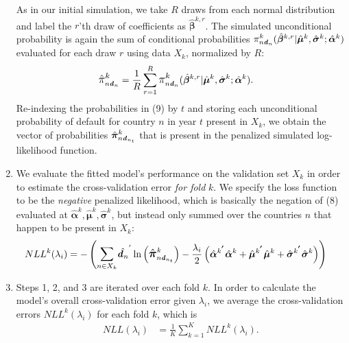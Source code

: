 \documentclass[12pt]{article}
\begin{document}
\begin{enumerate}[listparindent=\parindent]
As in our initial simulation, we take $R$ draws from each normal distribution and label the $r$'th draw of coefficients as $\hat{\boldsymbol{\beta}}^{k,r}$. The simulated unconditional probability is again the sum of conditional probabilities $\mathlarger{\pi^{k}}_{n\boldsymbol{\mathit{d}}_n}(\hat{\boldsymbol{\beta}}^{k,r}|\hat{\boldsymbol{\mu}}^{k}, \hat{\boldsymbol{\sigma}}^{k}; \hat{\boldsymbol{\alpha}}^{k})$ evaluated for each draw $r$ using data $X_k$, normalized by $R$:
\begin{align}
\mathlarger{\hat{\pi}^{k}}_{n\boldsymbol{\mathit{d}}_n} &= 
\frac{1}{R} \sum\limits_{r=1}^{R} \mathlarger{\pi^{k}}_{n\boldsymbol{\mathit{d}}_n}(\hat{\boldsymbol{\beta}}^{k,r}|\hat{\boldsymbol{\mu}}^{k}, \hat{\boldsymbol{\sigma}}^{k}; \hat{\boldsymbol{\alpha}}^{k}).
\end{align}
Re-indexing the probabilities in (9) by $t$ and storing each unconditional probability of default for country $n$ in year $t$ present in $X_k$, we obtain the vector of probabilities $\mathlarger{\hat{\boldsymbol{\pi}}}^{k}_{n\boldsymbol{\mathit{d}}_{n_{t}}}$ that is present in the penalized simulated log-likelihood function.

\item We evaluate the fitted model's performance on the validation set $X_k$ in order to estimate the cross-validation error \textit{for fold} $k$. We specify the loss function to be the \textit{negative} penalized likelihood, which is basically the negation of (8) evaluated at $\hat{\boldsymbol{\alpha}}^{k}, \hat{\boldsymbol{\mu}}^{k}, \hat{\boldsymbol{\sigma}}^{k}$, but instead only summed over the countries $n$ that happen to be present in $X_k$:
\begin{align*}
NLL^{k}(\lambda_i) &= -\left(\mathlarger{\sum}\limits_{n \in X_k} \hat{\boldsymbol{\mathit{d}}_n}^{'} \ln\left(\mathlarger{\hat{\boldsymbol{\pi}}}^{k}_{n\boldsymbol{\mathit{d}}_{n_{t}}}\right) - \frac{\lambda_i}{2}\left(\hat{\boldsymbol{\alpha}}^{k^{\bm{'}}}\hat{\boldsymbol{\alpha}}^{k} + \hat{\boldsymbol{\mu}}^{k^{\bm{'}}}\hat{\boldsymbol{\mu}}^{k} + \hat{\boldsymbol{\sigma}}^{k^{\bm{'}}}\hat{\boldsymbol{\sigma}}^{k}\right)\right)
\end{align*}

\item Steps 1, 2, and 3 are iterated over each fold $k$. In order to calculate the model's overall cross-validation error given $\lambda_i$, we average the cross-validation errors $NLL^{k}(\lambda_i)$ for each fold $k$, which is 
\begin{align*}
NLL(\lambda_i) &= \frac{1}{K} \sum \limits_{k=1}^{K} NLL^{k}(\lambda_i).
\end{align*}
\end{enumerate} 
\end{document}
